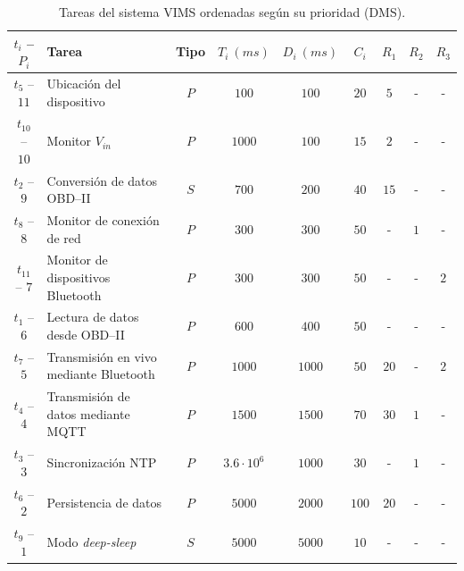 \begin{table}[H]
  \centering
  \begin{tabularx}{\linewidth}{c|X|c|c|c|c|c|c|c}
    $t_i$ -- $P_i$   & \textbf{Tarea}                         & \textbf{Tipo} & $T_i~\left(ms\right)$ & $D_i~\left(ms\right)$ & $C_i$ & $R_1$ & $R_2$ & $R_3$ \\
    \hline\hline
    $t_{5}$ -- $11$  & Ubicación del dispositivo              & $P$           & $100$                 & $100$                 & $20$  & $5$   & -     & -     \\
    $t_{10}$ -- $10$ & Monitor $V_{in}$                       & $P$           & $1000$                & $100$                 & $15$  & $2$   & -     & -     \\
    $t_{2}$ -- $9$   & Conversión de datos \ac{OBD}--II       & $S$           & $700$                 & $200$                 & $40$  & $15$  & -     & -     \\
    $t_{8}$ -- $8$   & Monitor de conexión de red             & $P$           & $300$                 & $300$                 & $50$  & -     & $1$   & -     \\
    $t_{11}$ -- $7$  & Monitor de dispositivos Bluetooth      & $P$           & $300$                 & $300$                 & $50$  & -     & -     & $2$   \\
    $t_{1}$ -- $6$   & Lectura de datos desde \ac{OBD}--II    & $P$           & $600$                 & $400$                 & $50$  & -     & -     & -     \\
    $t_{7}$ -- $5$   & Transmisión en vivo mediante Bluetooth & $P$           & $1000$                & $1000$                & $50$  & $20$  & -     & $2$   \\
    $t_{4}$ -- $4$   & Transmisión de datos mediante MQTT     & $P$           & $1500$                & $1500$                & $70$  & $30$  & $1$   & -     \\
    $t_{3}$ -- $3$   & Sincronización NTP                     & $P$           & $3.6 \cdot 10^6$      & $1000$                & $30$  & -     & $1$   & -     \\
    $t_{6}$ -- $2$   & Persistencia de datos                  & $P$           & $5000$                & $2000$                & $100$ & $20$  & -     & -     \\
    $t_{9}$ -- $1$   & Modo \textit{deep-sleep}               & $S$           & $5000$                & $5000$                & $10$  & -     & -     & -     \\
    \hline
  \end{tabularx}
  \caption{Tareas del sistema \ac{VIMS} ordenadas según su prioridad (\ac{DMS}).}
  \label{tab:rt-table-fulfilled}
\end{table}

